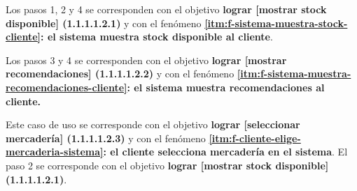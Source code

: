 Los pasos 1, 2 y 4 se corresponden con el objetivo \textbf{lograr 
[mostrar stock disponible] (1.1.1.1.2.1)} y con el fenómeno 
\textbf{\ref{itm:f-sistema-muestra-stock-cliente}: el sistema muestra 
stock disponible al cliente}.

Los pasos 3 y 4 se corresponden con el objetivo \textbf{lograr 
[mostrar recomendaciones] (1.1.1.1.2.2)} y con el fenómeno 
\textbf{\ref{itm:f-sistema-muestra-recomendaciones-cliente}: el sistema
muestra recomendaciones al cliente.}

%
%
\begin{casodeuso}
\end{casodeuso}

Este caso de uso se corresponde con el objetivo \textbf{lograr 
[seleccionar mercadería] (1.1.1.1.2.3)} y con el fenómeno 
\textbf{\ref{itm:f-cliente-elige-mercaderia-sistema}: el cliente 
selecciona mercadería en el sistema}. El paso 2 se corresponde 
con el objetivo \textbf{lograr [mostrar stock disponible] (1.1.1.1.2.1)}.

